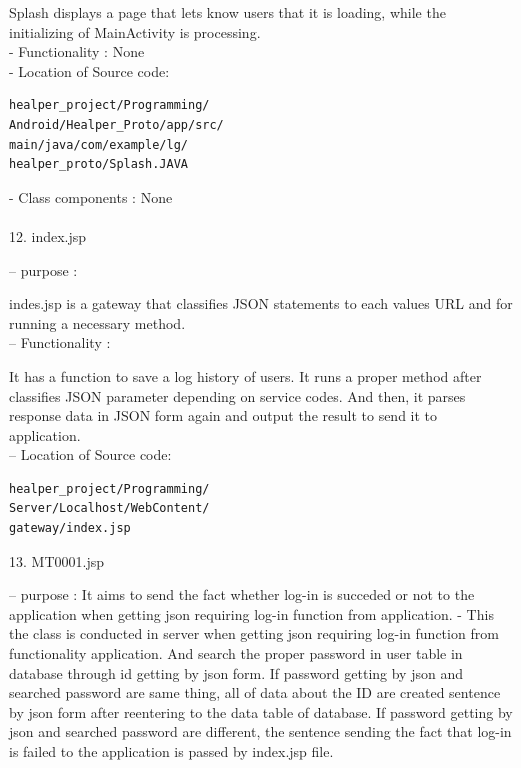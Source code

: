 \documentclass[conference]{IEEEtran}
\begin{document}
Splash displays a page that lets know users that it is loading, while the initializing of MainActivity is processing.\\


- Functionality : None\\

- Location of Source code:

\begin{verbatim}
healper_project/Programming/
Android/Healper_Proto/app/src/
main/java/com/example/lg/
healper_proto/Splash.JAVA
\end{verbatim}

- Class components : None\\\\

12. index.jsp

 -- purpose : 

indes.jsp is a gateway that classifies JSON statements to each values URL and for running a necessary method.\\

 -- Functionality : 

It has a function to save a log history of users. It runs a proper method after classifies JSON parameter depending on service codes. And then, it parses response data in JSON form again and output the result to send it to application.  \\

 -- Location of Source code:

\begin{verbatim}
healper_project/Programming/
Server/Localhost/WebContent/
gateway/index.jsp
\end{verbatim}

13. MT0001.jsp

 -- purpose : 
 It aims to send the fact whether log-in is succeded or not to the application when getting json requiring log-in function from application.
- This the class is conducted in server when getting json requiring log-in function from functionality application. And search the proper password in user table in database through id getting by json form. If password getting by json and searched password are same thing, all of data about the ID are created sentence by json form after reentering to the data table of database. If password getting by json and searched password are different, the sentence sending the fact that log-in is failed to the application is passed by index.jsp file.\\
\end{document}
